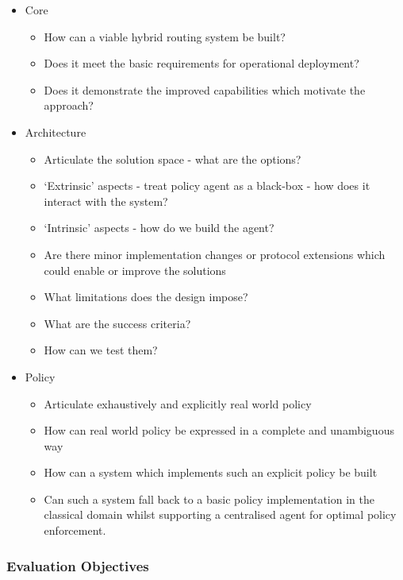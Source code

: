 \begin{itemize}
	\item Core
	      \begin{itemize}
		      \item How can a viable hybrid routing system be built?
		      \item Does it meet the basic requirements for operational deployment?
		      \item Does it demonstrate the improved capabilities which motivate the approach?
	      \end{itemize}
	\item Architecture
	      \begin{itemize}
		      \item Articulate the solution space - what are the options?
		      \item ‘Extrinsic’ aspects - treat policy agent as a black-box - how does it interact with the system?
		      \item ‘Intrinsic’ aspects - how do we build the agent?
		      \item Are there minor implementation changes or protocol extensions which could enable or improve the solutions
		      \item What limitations does the design impose?
		      \item What are the success criteria?
		      \item How can we test them?
	      \end{itemize}
	\item Policy
	      \begin{itemize}
		      \item Articulate exhaustively and explicitly real world policy
		      \item How can real world policy be expressed in a complete and unambiguous way
		      \item How can a system which implements such an explicit policy be built
		      \item Can such a system fall back to a basic policy implementation in the classical domain whilst supporting a centralised agent for optimal policy enforcement.
	      \end{itemize}
\end{itemize}

\subsubsection{Evaluation Objectives}

